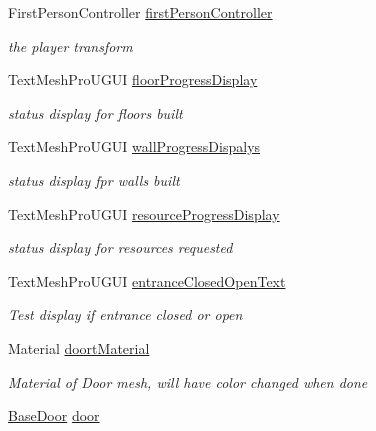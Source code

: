 \begin{DoxyCompactItemize}
\item 
First\+Person\+Controller \mbox{\hyperlink{class_museum_build_observer_a47fdbc350fee260a67469c35fdcd03da}{first\+Person\+Controller}}
\begin{DoxyCompactList}\small\item\em the player transform \end{DoxyCompactList}\item 
Text\+Mesh\+Pro\+U\+G\+UI \mbox{\hyperlink{class_museum_build_observer_a21bf3dceaf6f9eb310d52112357df8f2}{floor\+Progress\+Display}}
\begin{DoxyCompactList}\small\item\em status display for floors built \end{DoxyCompactList}\item 
Text\+Mesh\+Pro\+U\+G\+UI \mbox{\hyperlink{class_museum_build_observer_ae79ec7d93bf8943b78cd5dc8e5f1ecdd}{wall\+Progress\+Dispalys}}
\begin{DoxyCompactList}\small\item\em status display fpr walls built \end{DoxyCompactList}\item 
Text\+Mesh\+Pro\+U\+G\+UI \mbox{\hyperlink{class_museum_build_observer_a2a19b3d591d9debde4b275ab476b5123}{resource\+Progress\+Display}}
\begin{DoxyCompactList}\small\item\em status display for resources requested \end{DoxyCompactList}\item 
Text\+Mesh\+Pro\+U\+G\+UI \mbox{\hyperlink{class_museum_build_observer_a4086ee53944228851a48c234f0c03fa3}{entrance\+Closed\+Open\+Text}}
\begin{DoxyCompactList}\small\item\em Test display if entrance closed or open \end{DoxyCompactList}\item 
Material \mbox{\hyperlink{class_museum_build_observer_aeb87eca5f3badfe87f72e7258384452f}{doort\+Material}}
\begin{DoxyCompactList}\small\item\em Material of Door mesh, will have color changed when done \end{DoxyCompactList}\item 
\mbox{\hyperlink{class_base_door}{Base\+Door}} \mbox{\hyperlink{class_museum_build_observer_aee761ebe086d7c3e2c3c0901c3b6eea0}{door}}

\end{DoxyCompactItemize}

